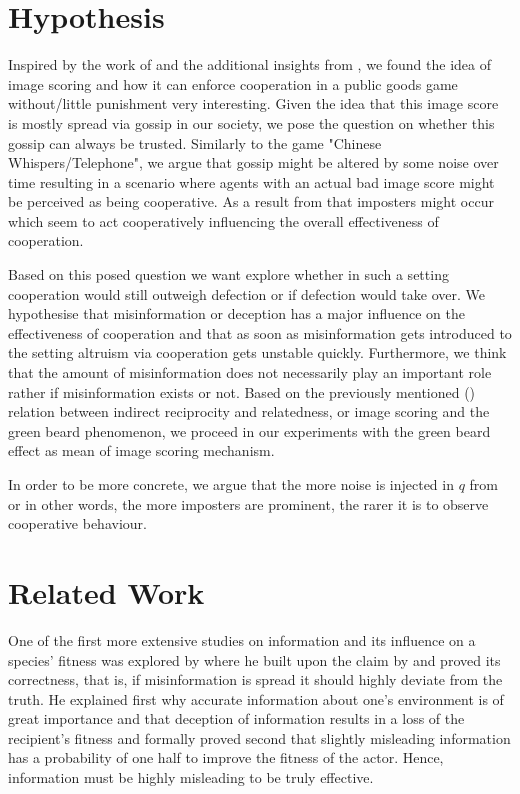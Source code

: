 \documentclass[sigconf]{acmart}
\begin{document}
    \section{Hypothesis}\label{sec:hypothesis}
    Inspired by the work of \citeauthor{milinski_cooperation_2002} \cite{milinski_cooperation_2002} and the additional insights from \citeauthor{roberts_kin_2019} \cite{roberts_kin_2019}, we found the idea of image scoring and how it can enforce cooperation in a public goods game without/little punishment very interesting.
    Given the idea that this image score is mostly spread via gossip in our society, we pose the question on whether this gossip can always be trusted.
    Similarly to the game "Chinese Whispers/Telephone", we argue that gossip might be altered by some noise over time resulting in a scenario where agents with an actual bad image score might be perceived as being cooperative.
    As a result from that imposters might occur which seem to act cooperatively influencing the overall effectiveness of cooperation.

    Based on this posed question we want explore whether in such a setting cooperation would still outweigh defection or if defection would take over.
    We hypothesise that misinformation or deception has a major influence on the effectiveness of cooperation and that as soon as misinformation gets introduced to the setting altruism via cooperation gets unstable quickly.
    Furthermore, we think that the amount of misinformation does not necessarily play an important role rather if misinformation exists or not.
    Based on the previously mentioned () relation between indirect reciprocity and relatedness, or image scoring and the green beard phenomenon, we proceed in our experiments with the green beard effect as mean of image scoring mechanism.

    In order to be more concrete, we argue that the more noise is injected in $q$ from  or in other words, the more imposters are prominent, the rarer it is to observe cooperative behaviour.


    \section{Related Work}\label{sec:related_work}
    One of the first more extensive studies on information and its influence on a species' fitness was explored by \citeauthor{wallace_misinformation_1973} \cite{wallace_misinformation_1973} where he built upon the claim by \citeauthor{fisherGeneticalTheoryNatural1930} \cite{fisherGeneticalTheoryNatural1930} and proved its correctness, that is, if misinformation is spread it should highly deviate from the truth.
    He explained first why accurate information about one's environment is of great importance and that deception of information results in a loss of the recipient's fitness and formally proved second that slightly misleading information has a probability of one half to improve the fitness of the actor.
    Hence, information must be highly misleading to be truly effective.
\end{document}
